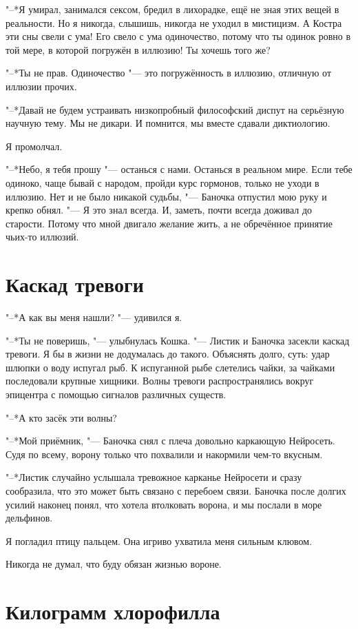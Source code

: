 \documentclass[a4paper,10pt,fleqn]{book}
\begin{document}
"--*Я умирал, занимался сексом, бредил в лихорадке, ещё не зная этих вещей в реальности.
Но я никогда, слышишь, никогда не уходил в мистицизм.
А Костра эти сны свели с ума!
Его свело с ума одиночество, потому что ты одинок ровно в той мере, в которой погружён в иллюзию!
Ты хочешь того же?

"--*Ты не прав.
Одиночество "--- это погружённость в иллюзию, отличную от иллюзии прочих.

"--*Давай не будем устраивать низкопробный философский диспут на серьёзную научную тему.
Мы не дикари.
И помнится, мы вместе сдавали диктиологию.

Я промолчал.

"--*Небо, я тебя прошу "--- останься с нами.
Останься в реальном мире.
Если тебе одиноко, чаще бывай с народом, пройди курс гормонов, только не уходи в иллюзию.
Нет и не было никакой судьбы, "--- Баночка отпустил мою руку и крепко обнял.
"--- Я это знал всегда.
И, заметь, почти всегда доживал до старости.
Потому что мной двигало желание жить, а не обречённое принятие чьих-то иллюзий.

\section{Каскад тревоги}

"--*А как вы меня нашли? "--- удивился я.

"--*Ты не поверишь, "--- улыбнулась Кошка.
"--- Листик и Баночка засекли каскад тревоги.
Я бы в жизни не додумалась до такого.
Объяснять долго, суть: удар шлюпки о воду испугал рыб.
К испуганной рыбе слетелись чайки, за чайками последовали крупные хищники.
Волны тревоги распространялись вокруг эпицентра с помощью сигналов различных существ.

"--*А кто засёк эти волны?

"--*Мой приёмник, "--- Баночка снял с плеча довольно каркающую Нейросеть.
Судя по всему, ворону только что похвалили и накормили чем-то вкусным.

"--*Листик случайно услышала тревожное карканье Нейросети и сразу сообразила, что это может быть связано с перебоем связи.
Баночка после долгих усилий наконец понял, что хотела втолковать ворона, и мы послали в море дельфинов.

Я погладил птицу пальцем.
Она игриво ухватила меня сильным клювом.

Никогда не думал, что буду обязан жизнью вороне.

\section{Килограмм хлорофилла}
\end{document}
